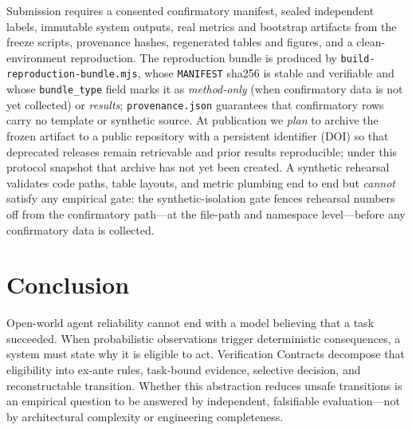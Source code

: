 \documentclass[sigconf,anonymous,review]{acmart}
\begin{document}
Submission requires a consented confirmatory manifest, sealed independent labels, immutable system outputs, real metrics and bootstrap artifacts from the freeze scripts, provenance hashes, regenerated tables and figures, and a clean-environment reproduction. The reproduction bundle is produced by \texttt{build-reproduction-bundle.mjs}, whose \texttt{MANIFEST} sha256 is stable and verifiable and whose \texttt{bundle\_type} field marks it as \emph{method-only} (when confirmatory data is not yet collected) or \emph{results}; \texttt{provenance.json} guarantees that confirmatory rows carry no template or synthetic source. At publication we \emph{plan} to archive the frozen artifact to a public repository with a persistent identifier (DOI) so that deprecated releases remain retrievable and prior results reproducible; under this protocol snapshot that archive has not yet been created. A synthetic rehearsal validates code paths, table layouts, and metric plumbing end to end but \emph{cannot} satisfy any empirical gate: the synthetic-isolation gate fences rehearsal numbers off from the confirmatory path---at the file-path and namespace level---before any confirmatory data is collected.

\section{Conclusion}
Open-world agent reliability cannot end with a model believing that a task succeeded. When probabilistic observations trigger deterministic consequences, a system must state why it is eligible to act. Verification Contracts decompose that eligibility into ex-ante rules, task-bound evidence, selective decision, and reconstructable transition. Whether this abstraction reduces unsafe transitions is an empirical question to be answered by independent, falsifiable evaluation---not by architectural complexity or engineering completeness.


\end{document}
